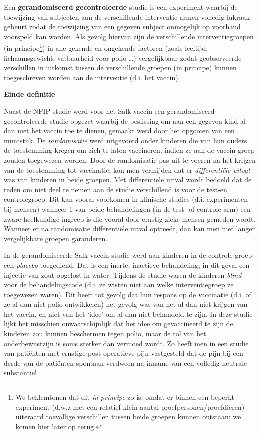 \documentclass[
  12pt,dutch]{book}
\theoremstyle{definition}
\theoremstyle{definition}
\theoremstyle{definition}
\theoremstyle{definition}
\theoremstyle{remark}
\begin{document}
Een \textbf{gerandomiseerd gecontroleerde} studie is een experiment waarbij
de toewijzing van subjecten aan de verschillende interventie-armen volledig
lukraak gebeurt zodat de toewijzing van een gegeven subject onmogelijk op
voorhand voorspeld kan worden. Als gevolg hiervan zijn de verschillende
interventiegroepen (in principe\footnote{We beklemtonen dat dit \emph{in principe} zo is, omdat er binnen een beperkt experiment (d.w.z met een relatief klein aantal proefpersonen/proefdieren) uiteraard toevallige verschillen tussen beide groepen kunnen ontstaan; we komen hier later op terug.}) in alle gekende en ongekende factoren (zoals
leeftijd, lichaamsgewicht, vatbaarheid voor polio \ldots) vergelijkbaar zodat
geobserveerde verschillen in uitkomst tussen de verschillende groepen (in
principe) kunnen toegeschreven worden aan de interventie (d.i. het vaccin).

\textbf{Einde definitie}

Naast de NFIP studie werd voor het Salk vaccin een gerandomiseerd
gecontroleerde studie opgezet waarbij de beslissing om aan een gegeven kind
al dan niet het vaccin toe te dienen, gemaakt werd door het opgooien van een
muntstuk. De \emph{randomisatie} werd uitgevoerd onder kinderen die van
hun ouders de toestemming kregen om zich te laten vaccineren, indien ze aan de
vaccin-groep zouden toegewezen worden. Door de randomisatie pas uit te
voeren na het krijgen van de toestemming tot vaccinatie, kon men vermijden
dat er \emph{differentiële uitval} was van kinderen in beide
groepen. Met differentiële uitval wordt bedoeld dat de reden om niet
deel te nemen aan de studie verschillend is voor de test-en controlegroep.
Dit kan vooral voorkomen in klinische studies (d.i. experimenten bij mensen)
wanneer 1 van beide behandelingen (in de test- of
controle-arm) een zware heelkundige ingreep is die vooral door ernstig zieke
mensen gemeden wordt. Wanneer er na randomisatie differentiële uitval
optreedt, dan kan men niet langer vergelijkbare groepen garanderen.

In de gerandomiseerde Salk vaccin studie werd aan kinderen in de
controle-groep een \emph{placebo} toegediend. Dat is een inerte, inactieve
behandeling; in dit geval een injectie van zout opgelost in water. Tijdens
de studie waren de kinderen \emph{blind} voor de behandelingscode (d.i. ze
wisten niet aan welke interventiegroep ze toegewezen waren). Dit heeft tot
gevolg dat hun respons op de vaccinatie (d.i. of ze al dan niet polio
ontwikkelen) het gevolg was van het al dan niet krijgen van het vaccin, en
niet van het `idee' om al dan niet behandeld te zijn. In deze studie lijkt het misschien onwaarschijnlijk dat het idee
om gevaccineerd te zijn de kinderen zou kunnen beschermen tegen polio, maar
de rol van het onderbewustzijn is soms sterker dan vermoed wordt. Zo heeft
men in een studie van patiënten met ernstige post-operatieve pijn
vastgesteld dat de pijn bij een derde van de patiënten spontaan verdween
na inname van een volledig neutrale substantie!
\end{document}
